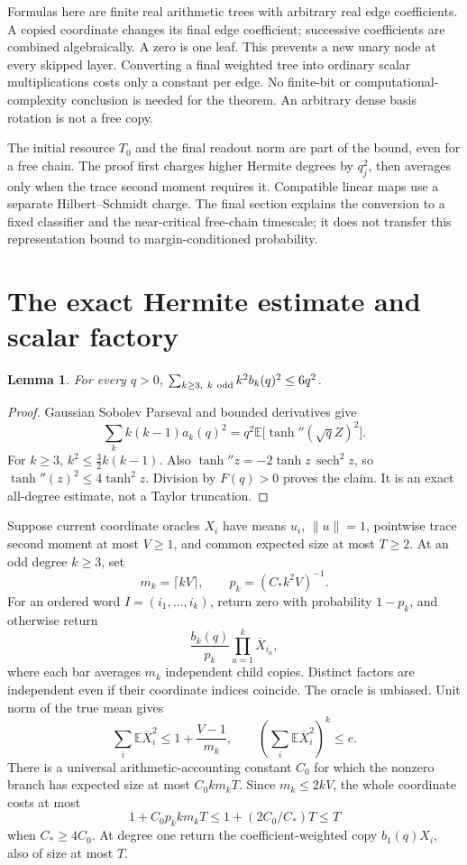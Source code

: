 \documentclass[11pt]{article}
\newtheorem{lemma}[theorem]{Lemma}
\newcommand{\E}{\mathbb E}
\newcommand{\norm}[1]{\lVert #1\rVert}
\begin{document}
Formulas here are finite real arithmetic trees with arbitrary real edge
coefficients. A copied coordinate changes its final edge coefficient;
successive coefficients are combined algebraically. A zero is one leaf.
This prevents a new unary node at every skipped layer. Converting a final
weighted tree into ordinary scalar multiplications costs only a constant
per edge. No finite-bit or computational-complexity conclusion is needed
for the theorem. An arbitrary dense basis rotation is not a free copy.

The initial resource $T_0$ and the final readout norm are part of the
bound, even for a free chain. The proof first charges higher Hermite
degrees by $q_j^2$, then averages only when the trace second moment
requires it. Compatible linear maps use a separate
Hilbert--Schmidt charge. The final section explains the conversion to a
fixed classifier and the near-critical free-chain timescale; it does not
transfer this representation bound to margin-conditioned probability.

\section{The exact Hermite estimate and scalar factory}

\begin{lemma}\label{lem:tail}
For every $q>0$, $\sum_{k\ge3,\ k\ {\rm odd}}k^2b_k(q)^2\le6q^2$.
\end{lemma}
\begin{proof}
Gaussian Sobolev Parseval and bounded derivatives give
\[
 \sum_k k(k-1)a_k(q)^2
   =q^2\E\bigl[\tanh''(\sqrt q Z)^2\bigr].
\]
For $k\ge3$, $k^2\le\tfrac32k(k-1)$. Also
$\tanh''z=-2\tanh z\,\operatorname{sech}^2z$, so
$\tanh''(z)^2\le4\tanh^2z$. Division by $F(q)>0$ proves the claim.
It is an exact all-degree estimate, not a Taylor truncation.
\end{proof}

Suppose current coordinate oracles $X_i$ have means $u_i$, $\norm u=1$,
pointwise trace second moment at most $V\ge1$, and common expected size
at most $T\ge2$. At an odd degree $k\ge3$, set
\[
 m_k=\lceil kV\rceil,\qquad p_k=(C_*k^2V)^{-1}.
\]
For an ordered word $I=(i_1,\ldots,i_k)$, return zero with probability
$1-p_k$, and otherwise return
\[
 \frac{b_k(q)}{p_k}\prod_{a=1}^k\overline X_{i_a},
\]
where each bar averages $m_k$ independent child copies. Distinct factors
are independent even if their coordinate indices coincide. The oracle
is unbiased. Unit norm of the true mean gives
\[
 \sum_i\E\overline X_i^2
 \le1+\frac{V-1}{m_k},\qquad
 \left(\sum_i\E\overline X_i^2\right)^k\le e.
\]
There is a universal arithmetic-accounting constant $C_0$ for which the
nonzero branch has expected size at most $C_0km_kT$. Since $m_k\le2kV$,
the whole coordinate costs at most
\[
 1+C_0p_kkm_kT\le1+(2C_0/C_*)T\le T
\]
when $C_*\ge4C_0$. At degree one return the coefficient-weighted copy
$b_1(q)X_i$, also of size at most $T$.
\end{document}
